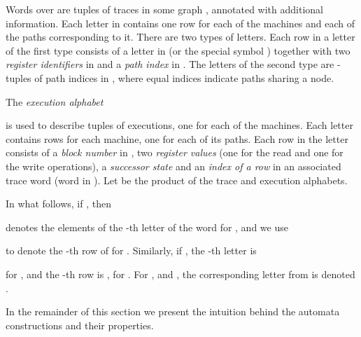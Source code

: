 Words over  are tuples of  traces in some graph , annotated with additional information. Each letter in  contains one row for each of the  machines and each of the  paths corresponding to it. There are two types of letters. Each row in a letter of the first type consists of a letter in  (or the special symbol ) together with two \emph{register identifiers} in   and a \emph{path index} in . The letters of the second type are -tuples of path indices in , where equal indices indicate paths sharing a node. 

The \emph{execution alphabet}

is used to describe tuples of executions, one for each of the  machines. 
Each letter contains  rows for each machine, one for each of its paths. Each row in the letter consists of a \emph{block number} in , two \emph{register values} (one for the read and one for the write operations), a \emph{successor state} and an \emph{index of a row} in an associated trace word (word in ).
Let  be the product of the trace and execution alphabets.

In what follows, if , then 
 
denotes the elements of the -th letter of the word  for , and we use
 
to denote the -th row of  for .
Similarly, if , 
the -th letter is

for , 
and the -th row is
,
for .
For ,  and ,
the corresponding letter from  is denoted
.

In the remainder of this section we present the intuition behind the automata 
constructions and their properties.

